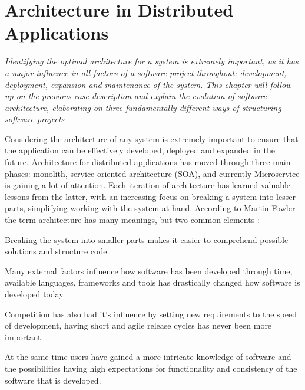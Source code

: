 \chapter{Architecture in Distributed Applications}
\label{ch:architecture}

\textit{Identifying the optimal architecture for a system is extremely important, as it has a major influence in all factors of a software project throughout: development, deployment, expansion and maintenance of the system. This chapter will follow up on the previous case description and explain the evolution of software architecture, elaborating on three fundamentally different ways of structuring software projects}

Considering the architecture of any system is extremely important to ensure that the application can be effectively developed, deployed and expanded in the future. Architecture for distributed applications has moved through three main phases: monolith, service oriented architecture (SOA), and currently Microservice is gaining a lot of attention. Each iteration of architecture has learned valuable lessons from the latter, with an increasing focus on breaking a system into lesser parts, simplifying working with the system at hand. According to Martin Fowler the term architecture has many meanings, but two common elements \cite[p.~1]{fowler2002patterns}:

Breaking the system into smaller parts makes it easier to comprehend possible solutions and structure code.

Many external factors influence how software has been developed through time, available languages, frameworks and tools has drastically changed how software is developed today. 

Competition has also had it's influence by setting new requirements to the speed of development, having short and agile release cycles has never been more important.

At the same time users have gained a more intricate knowledge of software and the possibilities having high expectations for functionality and consistency of the software that is developed.



